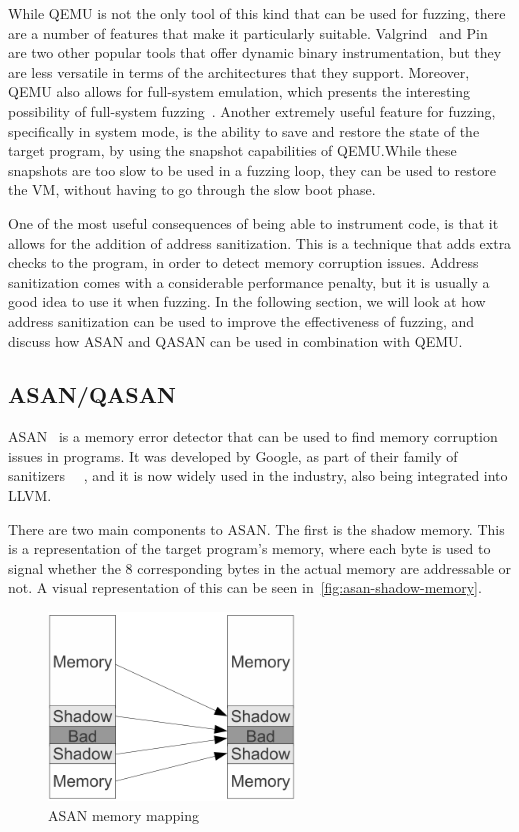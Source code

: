 While QEMU is not the only tool of this kind that can be used for fuzzing, there are a number of features that make it 
particularly suitable. Valgrind~\parencite{10.1145/1250734.1250746} and Pin~\parencite{10.1145/1275571.1275600} are two 
other popular tools that offer dynamic binary instrumentation, but they are less versatile in terms of the architectures
that they support. Moreover, QEMU also allows for full-system emulation, which presents the interesting possibility of
full-system fuzzing~\parencite{malmain:hal-04500872}. Another extremely useful feature for fuzzing, specifically
in system mode, is the ability to save and restore the state of the target program, by using the snapshot capabilities
of QEMU.\@ While these snapshots are too slow to be used in a fuzzing loop, they can be used to restore the \ac{VM}, without
having to go through the slow boot phase.

One of the most useful consequences of being able to instrument code, is that it allows for the addition of address
sanitization. This is a technique that adds extra checks to the program, in order to detect memory corruption issues.
Address sanitization comes with a considerable performance penalty, but it is usually a good idea to use it when fuzzing.
In the following section, we will look at how address sanitization can be used to improve the effectiveness of fuzzing, and
discuss how \ac{ASAN} and \ac{QASAN} can be used in combination with QEMU.\@


\subsection{ASAN/QASAN}
\ac{ASAN}~\parencite{10.5555/2342821.2342849} is a memory error detector that can be used to find memory corruption issues in
programs. It was developed by Google, as part of their family of sanitizers~\parencite{43308}
~\parencite{10.1145/1791194.1791203}, and it is now widely used in the industry, also being integrated into LLVM.\@

There are two main components to \ac{ASAN}. The first is the shadow memory. This is a representation of the target
program's memory, where each byte is used to signal whether the 8 corresponding bytes in the actual memory are addressable
or not. A visual representation of this can be seen in~\autoref{fig:asan-shadow-memory}.

\begin{figure}[htpb]
    \centering
    \includegraphics[height=50mm]{figures/asan_shadow_memory.png}
    \caption[ASAN Shadow]{\ac{ASAN} memory mapping~\parencite{10.5555/2342821.2342849}}\label{fig:asan-shadow-memory}
\end{figure}

